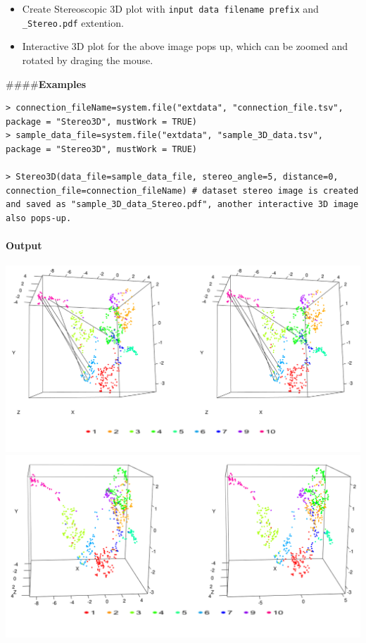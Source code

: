 \documentclass[]{article}
\providecommand{\tightlist}{%
  \setlength{\itemsep}{0pt}\setlength{\parskip}{0pt}}
\let\oldparagraph\paragraph
\renewcommand{\paragraph}[1]{\oldparagraph{#1}\mbox{}}
\begin{document}
\begin{itemize}
\tightlist
\item
  Create Stereoscopic 3D plot with
  \texttt{input\ data\ filename\ prefix} and \texttt{\_Stereo.pdf}
  extention.
\item
  Interactive 3D plot for the above image pops up, which can be zoomed
  and rotated by draging the mouse.
\end{itemize}

\#\#\#\#\textbf{Examples}

\begin{verbatim}
> connection_fileName=system.file("extdata", "connection_file.tsv",
package = "Stereo3D", mustWork = TRUE)
> sample_data_file=system.file("extdata", "sample_3D_data.tsv",
package = "Stereo3D", mustWork = TRUE)

> Stereo3D(data_file=sample_data_file, stereo_angle=5, distance=0,
connection_file=connection_fileName) # dataset stereo image is created
and saved as "sample_3D_data_Stereo.pdf", another interactive 3D image also pops-up.
\end{verbatim}

\hypertarget{output}{%
\paragraph{Output}\label{output}}

\includegraphics{./sample.png} \includegraphics{./sample_scatter.png}
\end{document}
